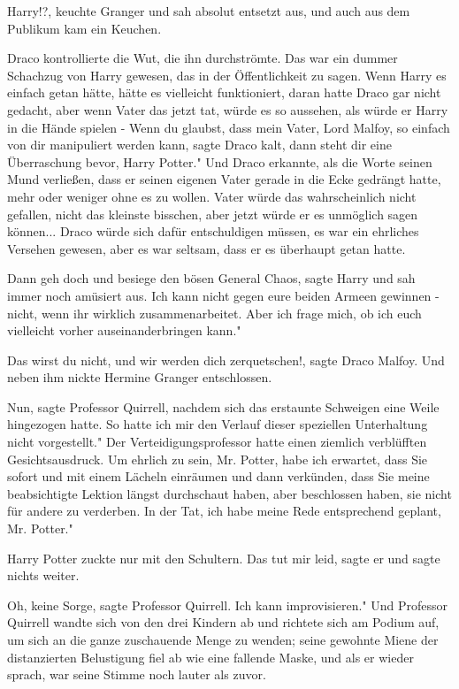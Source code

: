 \glqq Harry!?\grqq{}, keuchte Granger und sah absolut entsetzt aus, und auch aus
dem Publikum kam ein Keuchen.

Draco kontrollierte die Wut, die ihn durchströmte. Das war ein dummer Schachzug
von Harry gewesen, das in der Öffentlichkeit zu sagen. Wenn Harry es einfach
getan hätte, hätte es vielleicht funktioniert, daran hatte Draco gar nicht
gedacht, aber wenn Vater das jetzt tat, würde es so aussehen, als würde er Harry
in die Hände spielen - \glqq Wenn du glaubst, dass mein Vater, Lord Malfoy, so
einfach von dir manipuliert werden kann\grqq{}, sagte Draco kalt, \glqq dann
steht dir eine Überraschung bevor, Harry Potter." Und Draco erkannte, als die
Worte seinen Mund verließen, dass er seinen eigenen Vater gerade in die Ecke
gedrängt hatte, mehr oder weniger ohne es zu wollen. Vater würde das
wahrscheinlich nicht gefallen, nicht das kleinste bisschen, aber jetzt würde er
es unmöglich sagen können... Draco würde sich dafür entschuldigen müssen, es war
ein ehrliches Versehen gewesen, aber es war seltsam, dass er es überhaupt getan
hatte.

\glqq Dann geh doch und besiege den bösen General Chaos\grqq{}, sagte Harry und
sah immer noch amüsiert aus. \glqq Ich kann nicht gegen eure beiden Armeen
gewinnen - nicht, wenn ihr wirklich zusammenarbeitet. Aber ich frage mich, ob
ich euch vielleicht vorher auseinanderbringen kann."

\glqq Das wirst du nicht, und wir werden dich zerquetschen!\grqq{}, sagte Draco
Malfoy. Und neben ihm nickte Hermine Granger entschlossen.

\glqq Nun\grqq{}, sagte Professor Quirrell, nachdem sich das erstaunte Schweigen
eine Weile hingezogen hatte. \glqq So hatte ich mir den Verlauf dieser
speziellen Unterhaltung nicht vorgestellt." Der Verteidigungsprofessor hatte
einen ziemlich verblüfften Gesichtsausdruck. \glqq Um ehrlich zu sein, Mr.
Potter, habe ich erwartet, dass Sie sofort und mit einem Lächeln einräumen und
dann verkünden, dass Sie meine beabsichtigte Lektion längst durchschaut haben,
aber beschlossen haben, sie nicht für andere zu verderben. In der Tat, ich habe
meine Rede entsprechend geplant, Mr. Potter."

Harry Potter zuckte nur mit den Schultern. \glqq Das tut mir leid\grqq{}, sagte
er und sagte nichts weiter.

\glqq Oh, keine Sorge\grqq{}, sagte Professor Quirrell. \glqq Ich kann
improvisieren." Und Professor Quirrell wandte sich von den drei Kindern ab und
richtete sich am Podium auf, um sich an die ganze zuschauende Menge zu wenden;
seine gewohnte Miene der distanzierten Belustigung fiel ab wie eine fallende
Maske, und als er wieder sprach, war seine Stimme noch lauter als zuvor.

